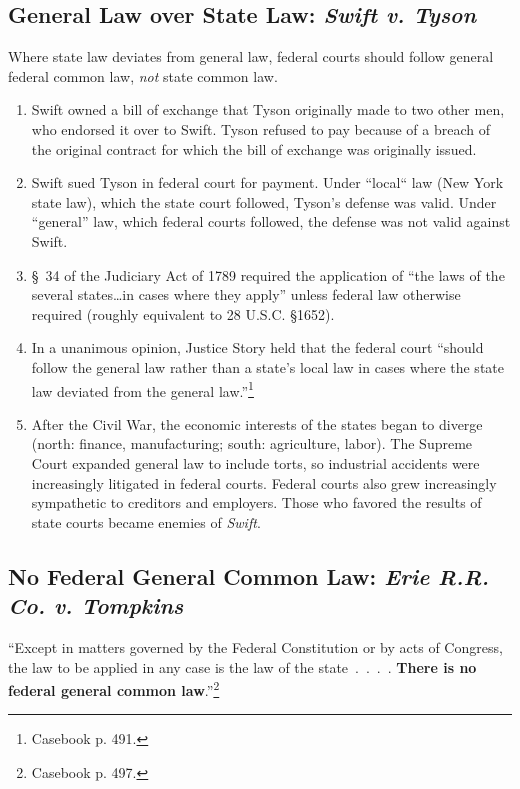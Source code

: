 \subsection{General Law over State Law: \emph{Swift v. Tyson}}

Where state law deviates from general law, federal courts should follow 
general federal common law, \emph{not} state common law.

\begin{enumerate}
    \item Swift owned a bill of exchange that Tyson originally made to two 
    other men, who endorsed it over to Swift. Tyson refused to pay because of 
    a breach of the original contract for which the bill of exchange was 
    originally issued.
    \item Swift sued Tyson in federal court for payment. Under 
    ``local`` law (New York state law), which the state court followed, 
    Tyson's defense was valid. Under ``general'' law, which federal courts 
    followed, the defense was not valid against Swift.
    \item \S\ 34 of the Judiciary Act of 1789 required the application of ``the 
    laws of the several states\ldots in cases where they apply'' unless 
    federal law otherwise required (roughly equivalent to 28 U.S.C. \S 1652).
    \item In a unanimous opinion, Justice Story held that the federal court 
    ``should follow the general law rather than a state's local law in cases 
    where the state law deviated from the general law.''\footnote{Casebook p. 
    491.}
    \item After the Civil War, the economic interests of the states began to 
    diverge (north: finance, manufacturing; south: agriculture, labor). The 
    Supreme Court expanded general law to include torts, so industrial 
    accidents were increasingly litigated in federal courts. Federal courts 
    also grew increasingly sympathetic to creditors and employers. Those who 
    favored the results of state courts became enemies of \emph{Swift}.
\end{enumerate}

\subsection{No Federal General Common Law: \emph{Erie R.R. Co. v. Tompkins}}

``Except in matters governed by the Federal Constitution or by acts of 
Congress, the law to be applied in any case is the law of the state~.~.~.~.  
\textbf{There is no federal general common law}.''\footnote{Casebook p. 497.}


